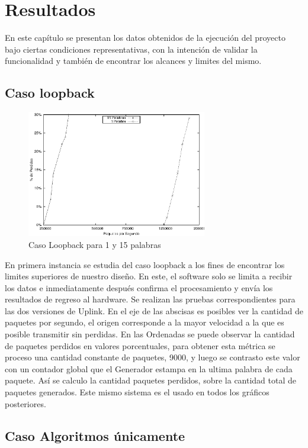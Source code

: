 \chapter{Resultados}

En este capítulo se presentan los datos obtenidos de la ejecución del proyecto bajo ciertas condiciones representativas, con la intención de validar la funcionalidad y también de encontrar los alcances y limites del mismo. 

\section{Caso loopback}
\begin{figure}[h]
  \centering
	\includegraphics[width=0.70\textwidth]{5-resultados/graf/loop.eps}
  \caption{Caso Loopback para 1 y 15 palabras}
  \label{fig}
\end{figure}
En primera instancia se estudia del caso loopback a los fines de encontrar los limites superiores de nuestro dise\~no.  En este, el software solo se limita a recibir los datos e inmediatamente después confirma el procesamiento y envía los resultados de regreso al hardware. Se realizan las pruebas correspondientes para las dos versiones de Uplink.
En el eje de las abscisas es posibles ver la cantidad de paquetes por segundo, el origen corresponde a la mayor velocidad a la que es posible transmitir sin perdidas. En las Ordenadas se puede observar la cantidad de paquetes perdidos en valores porcentuales, para obtener esta métrica se proceso una cantidad constante de paquetes, 9000, y luego se contrasto este valor con un contador global que el Generador estampa en la ultima palabra de cada paquete. Así se calculo la cantidad paquetes perdidos, sobre la cantidad total de paquetes generados. Este mismo sistema es el usado en todos los gráficos posteriores.

\section{Caso Algoritmos únicamente}

